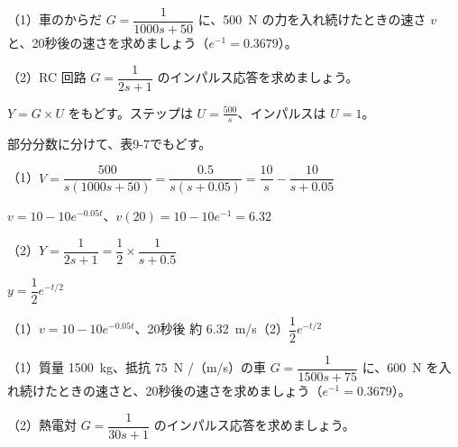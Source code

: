 \begin{reidai}[ステップ応答とインパルス応答]
（1）\nobreak 車のからだ $G=\dfrac{1}{1000s+50}$ に、\qty{500}{N} の力を入れ続けたときの速さ $v$ と、20秒後の速さを求めましょう（$e^{-1}=0.3679$）。\par
（2）\nobreak RC 回路 $G=\dfrac{1}{2s+1}$ のインパルス応答を求めましょう。\par
\kangaekata {}\par
{}\enspace $Y=G\times U$ をもどす。ステップは $U=\frac{500}{s}$、インパルスは $U=1$。\par
{}\enspace 部分分数に分けて、表9-7でもどす。\par
\shiki\kixis{}\zw{} （1）$V=\dfrac{500}{s(1000s+50)}=\dfrac{0.5}{s(s+0.05)}=\dfrac{10}{s}-\dfrac{10}{s+0.05}$\par
\kixib $v=10-10e^{-0.05t}$、$v(20)=10-10e^{-1}=6.32$\par
\kixia （2）$Y=\dfrac{1}{2s+1}=\dfrac12\times\dfrac{1}{s+0.5}$\par
\kixib $y=\dfrac12e^{-t/2}$\par
\kotae （1）\nobreak $v=10-10e^{-0.05t}$、20秒後 約 \qty{6.32}{m/s}\quad（2）\nobreak $\dfrac12e^{-t/2}$
\end{reidai}

\begin{jibun}
（1）\nobreak 質量 \qty{1500}{kg}、抵抗 \qty{75}{N} /（m/s）の車 $G=\dfrac{1}{1500s+75}$ に、\qty{600}{N} を入れ続けたときの速さと、20秒後の速さを求めましょう（$e^{-1}=0.3679$）。\par
（2）\nobreak 熱電対 $G=\dfrac{1}{30s+1}$ のインパルス応答を求めましょう。
\end{jibun}

